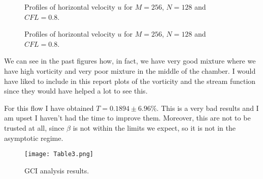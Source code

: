 \begin{figure}[H]
\centering     %
\hspace*{\fill}
\hfill
{}
\hspace*{\fill}

\hspace*{\fill}
\hfill
{}
\hspace*{\fill}

\hspace*{\fill}
\hfill
{}
\hspace*{\fill}
\caption{Profiles of horizontal velocity $u$ for $M=256$, $N=128$ and $CFL=0.8$.}
\end{figure}

\begin{figure}[H]
\centering     %
\hspace*{\fill}
\hfill
{}
\hspace*{\fill}

\hspace*{\fill}
\hfill
{}
\hspace*{\fill}
\caption{Profiles of horizontal velocity $u$ for $M=256$, $N=128$ and $CFL=0.8$.}
\end{figure}

We can see in the past figures how, in fact, we have very good mixture where we have high vorticity and very poor mixture in the middle of the chamber. I would have liked to include in this report plots of the vorticity and the stream function since they would have helped a lot to see this. 

For this flow I have obtained $T=0.1894\pm 6.96\%$. This is a very bad results and I am upset I haven't had the time to improve them. Moreover, this are not to be trusted at all, since $\beta$ is not within the limits we expect, so it is not in the asymptotic regime.

\begin{figure}[H]
\centering     %
\texttt{[image: Table3.png]}
\caption{GCI analysis results.}
\end{figure}